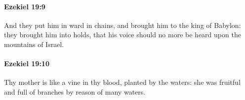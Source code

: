 		\paragraph{Ezekiel 19:9} %
			\label{EZEKIEL-19-9}

			And they put him in ward in chains, and brought him to the king of Babylon: they brought him into holds, that his voice should no more be heard upon the mountains of Israel.


		\paragraph{Ezekiel 19:10} %
			\label{EZEKIEL-19-10}

			Thy mother is like a vine in thy blood, planted by the waters: she was fruitful and full of branches by reason of many waters.


